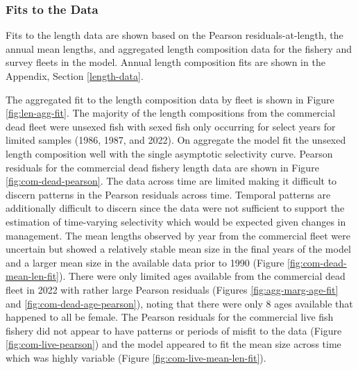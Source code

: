 \documentclass[11pt,
  english,
  letterpaper,
]{article}
\begin{document}
\hypertarget{fits-to-the-data}{%
\subsubsection{Fits to the Data}\label{fits-to-the-data}}

Fits to the length data are shown based on the Pearson residuals-at-length, the annual mean lengths, and aggregated length composition data for the fishery and survey fleets in the model. Annual length composition fits are shown in the Appendix, Section \ref{length-data}.

The aggregated fit to the length composition data by fleet is shown in Figure \ref{fig:len-agg-fit}. The majority of the length compositions from the commercial dead fleet were unsexed fish with sexed fish only occurring for select years for limited samples (1986, 1987, and 2022). On aggregate the model fit the unsexed length composition well with the single asymptotic selectivity curve. Pearson residuals for the commercial dead fishery length data are shown in Figure \ref{fig:com-dead-pearson}. The data across time are limited making it difficult to discern patterns in the Pearson residuals across time. Temporal patterns are additionally difficult to discern since the data were not sufficient to support the estimation of time-varying selectivity which would be expected given changes in management. The mean lengths observed by year from the commercial fleet were uncertain but showed a relatively stable mean size in the final years of the model and a larger mean size in the available data prior to 1990 (Figure \ref{fig:com-dead-mean-len-fit}). There were only limited ages available from the commercial dead fleet in 2022 with rather large Pearson residuals (Figures \ref{fig:agg-marg-age-fit} and \ref{fig:com-dead-age-pearson}), noting that there were only 8 ages available that happened to all be female. The Pearson residuals for the commercial live fish fishery did not appear to have patterns or periods of misfit to the data (Figure \ref{fig:com-live-pearson}) and the model appeared to fit the mean size across time which was highly variable (Figure \ref{fig:com-live-mean-len-fit}).
\end{document}
